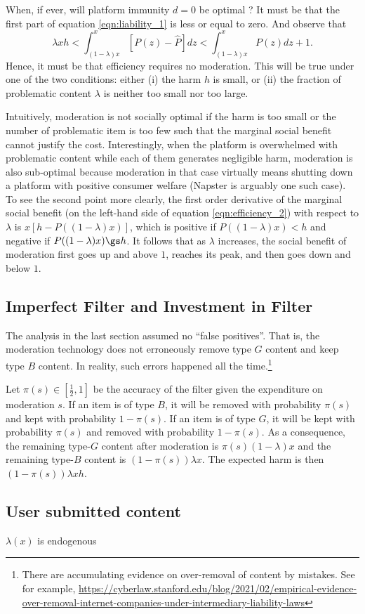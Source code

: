 When, if ever, will platform immunity $d=0$ be optimal ? It must be that the first part of equation \ref{eqn:liability_1} is less or equal to zero. And observe that 
\begin{equation*}
    \lambda xh < \int_{(1-\lambda)x}^x [P(z)-\hat{P}]dz < \int_{(1-\lambda)x}^x P(z)dz + 1.
\end{equation*}
Hence, it must be that efficiency requires no moderation. This will be true under one of the two conditions: either (i) the harm $h$ is small, or (ii) the fraction of problematic content $\lambda$ is neither too small nor too large. 

Intuitively, moderation is not socially optimal if the harm is too small or the number of problematic item is too few such that the marginal social benefit cannot justify the cost. Interestingly, when the platform is overwhelmed with problematic content while each of them generates negligible harm, moderation is also sub-optimal because moderation in that case virtually means shutting down a platform with positive consumer welfare (Napster is arguably one such case). 
To see the second point more clearly, the first order derivative of the marginal social benefit (on the left-hand side of equation \ref{eqn:efficiency_2}) with respect to $\lambda$ is $x[h-P((1-\lambda)x)]$, which is positive if $P((1-\lambda)x)<h$ and negative if $P((1-\lambda)x)\gs h$. It follows that as $\lambda$ increases, the social benefit of moderation first goes up and above $1$, reaches its peak, and then goes down and below $1$. 



\subsection{Imperfect Filter and Investment in Filter}

The analysis in the last section assumed no ``false positives''. That is, the moderation technology does not erroneously remove type $G$ content and keep type $B$ content. In reality, such errors happened all the time.\footnote{There are accumulating evidence on over-removal of content by mistakes. See for example, \url{https://cyberlaw.stanford.edu/blog/2021/02/empirical-evidence-over-removal-internet-companies-under-intermediary-liability-laws}}

Let $\pi(s)\in [\frac{1}{2},1]$ be the accuracy of the filter given the expenditure on moderation $s$. If an item is of type $B$, it will be removed with probability $\pi(s)$ and kept with probability $1-\pi(s)$. If an item is of type $G$, it will be kept with probability $\pi(s)$ and removed with probability $1-\pi(s)$. As a consequence, the remaining type-$G$ content after moderation is $\pi(s)(1-\lambda)x$ and the remaining type-$B$ content is $(1-\pi(s))\lambda x$. The expected harm is then $(1-\pi(s))\lambda xh$.



\subsection{User submitted content}
$\lambda(x)$ is endogenous